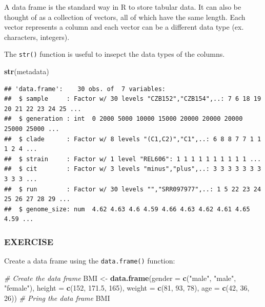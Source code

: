 \documentclass[]{book}
\newenvironment{Shaded}{\begin{snugshade}}{\end{snugshade}}
\newcommand{\CommentTok}[1]{\textcolor[rgb]{0.56,0.35,0.01}{\textit{#1}}}
\newcommand{\DataTypeTok}[1]{\textcolor[rgb]{0.13,0.29,0.53}{#1}}
\newcommand{\DecValTok}[1]{\textcolor[rgb]{0.00,0.00,0.81}{#1}}
\newcommand{\FloatTok}[1]{\textcolor[rgb]{0.00,0.00,0.81}{#1}}
\newcommand{\KeywordTok}[1]{\textcolor[rgb]{0.13,0.29,0.53}{\textbf{#1}}}
\newcommand{\NormalTok}[1]{#1}
\newcommand{\StringTok}[1]{\textcolor[rgb]{0.31,0.60,0.02}{#1}}
\begin{document}
A data frame is the standard way in R to store tabular data. It can also be thought of as a collection of vectors, all of which have the same length. Each vector represents a column and each vector can be a different data type (ex. characters, integers).

The \texttt{str()} function is useful to insepct the data types of the columns.

\begin{Shaded}
\begin{Highlighting}[]
\KeywordTok{str}\NormalTok{(metadata)}
\end{Highlighting}
\end{Shaded}

\begin{verbatim}
## 'data.frame':    30 obs. of  7 variables:
##  $ sample     : Factor w/ 30 levels "CZB152","CZB154",..: 7 6 18 19 20 21 22 23 24 25 ...
##  $ generation : int  0 2000 5000 10000 15000 20000 20000 20000 25000 25000 ...
##  $ clade      : Factor w/ 8 levels "(C1,C2)","C1",..: 6 8 8 7 7 1 1 1 2 4 ...
##  $ strain     : Factor w/ 1 level "REL606": 1 1 1 1 1 1 1 1 1 1 ...
##  $ cit        : Factor w/ 3 levels "minus","plus",..: 3 3 3 3 3 3 3 3 3 3 ...
##  $ run        : Factor w/ 30 levels "","SRR097977",..: 1 5 22 23 24 25 26 27 28 29 ...
##  $ genome_size: num  4.62 4.63 4.6 4.59 4.66 4.63 4.62 4.61 4.65 4.59 ...
\end{verbatim}

\hypertarget{exercise-10}{%
\subsubsection*{EXERCISE}\label{exercise-10}}

Create a data frame using the \texttt{data.frame()} function:

\begin{Shaded}
\begin{Highlighting}[]
\CommentTok{# Create the data frame}
\NormalTok{BMI <-}\StringTok{ }\KeywordTok{data.frame}\NormalTok{(}\DataTypeTok{gender =} \KeywordTok{c}\NormalTok{(}\StringTok{"male"}\NormalTok{, }\StringTok{"male"}\NormalTok{, }\StringTok{"female"}\NormalTok{), }\DataTypeTok{height =} \KeywordTok{c}\NormalTok{(}\DecValTok{152}\NormalTok{, }\FloatTok{171.5}\NormalTok{, }\DecValTok{165}\NormalTok{), }\DataTypeTok{weight =} \KeywordTok{c}\NormalTok{(}\DecValTok{81}\NormalTok{, }\DecValTok{93}\NormalTok{, }\DecValTok{78}\NormalTok{), }\DataTypeTok{age =} \KeywordTok{c}\NormalTok{(}\DecValTok{42}\NormalTok{, }\DecValTok{36}\NormalTok{, }\DecValTok{26}\NormalTok{))}
\CommentTok{# Pring the data frame}
\NormalTok{BMI}
\end{Highlighting}
\end{Shaded}
\end{document}

